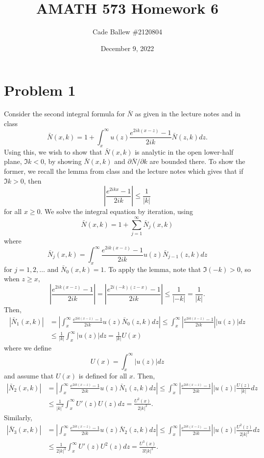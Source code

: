 \documentclass{article}
\title{AMATH 573 Homework 6}
\author{Cade Ballew \#2120804}
\date{December 9, 2022}
\begin{document}
	
\maketitle
	
\section{Problem 1}
Consider the second integral formula for $\bar N$ as given in the lecture notes and in class
\[
\bar N(x,k)=1+\int_{x}^{\infty}u(z)\frac{e^{2ik(x-z)}-1}{2ik}\bar N(z,k)dz.
\]
Using this, we wish to show that $\bar N(x,k)$ is analytic in the open lower-half plane, $\Im k<0$, by showing $\bar N(x,k)$ and $\partial \bar N/\partial k$ are bounded there. To show the former, we recall the lemma from class and the lecture notes which gives that if $\Im k>0$, then 
\[
\left|\frac{e^{2ikx}-1}{2ik}\right|\leq\frac{1}{|k|}
\]
for all $x\geq0$. We solve the integral equation by iteration, using 
\[
\bar N(x,k)=1+\sum_{j=1}^{\infty}\bar N_j(x,k)
\]
where
\[
\bar N_j(x,k)=\int_{x}^{\infty}\frac{e^{2ik(x-z)}-1}{2ik}u(z)\bar N_{j-1}(z,k)dz
\]
for $j=1,2,\ldots$ and $\bar N_0(x,k)=1$. To apply the lemma, note that $\Im(-k)>0$, so when $z\geq x$,
\[
\left|\frac{e^{2ik(x-z)}-1}{2ik}\right|=\left|\frac{e^{2i(-k)(z-x)}-1}{2ik}\right|\leq\frac{1}{|-k|}=\frac{1}{|k|}.
\]
Then,
\begin{align*}
|\bar N_1(x,k)|&=\left|\int_{x}^{\infty}\frac{e^{2ik(x-z)}-1}{2ik}u(z)\bar N_{0}(z,k)dz\right|\leq\int_{x}^{\infty}\left|\frac{e^{2ik(x-z)}-1}{2ik}\right||u(z)|dz\\&\leq
\frac{1}{|k|}\int_{x}^{\infty}|u(z)|dz=\frac{1}{|k|}U(x)
\end{align*}
where we define 
\[
U(x)=\int_x^\infty|u(z)|dz
\]
and assume that $U(x)$ is defined for all $x$. Then,
\begin{align*}
|\bar N_2(x,k)|&=\left|\int_{x}^{\infty}\frac{e^{2ik(x-z)}-1}{2ik}u(z)\bar N_{1}(z,k)dz\right|\leq\int_{x}^{\infty}\left|\frac{e^{2ik(x-z)}-1}{2ik}\right||u(z)|\frac{U(z)}{|k|}dz\\&\leq
\frac{1}{|k|^2}\int_{x}^{\infty}U'(z)U(z)dz=\frac{U^2(x)}{2|k|^2}.
\end{align*}
Similarly, 
\begin{align*}
	|\bar N_3(x,k)|&=\left|\int_{x}^{\infty}\frac{e^{2ik(x-z)}-1}{2ik}u(z)\bar N_{2}(z,k)dz\right|\leq\int_{x}^{\infty}\left|\frac{e^{2ik(x-z)}-1}{2ik}\right||u(z)|\frac{U^2(z)}{2|k|^2}dz\\&\leq
	\frac{1}{2|k|^3}\int_{x}^{\infty}U'(z)U^2(z)dz=\frac{U^3(x)}{3!|k|^3}.
\end{align*}
\end{document}
